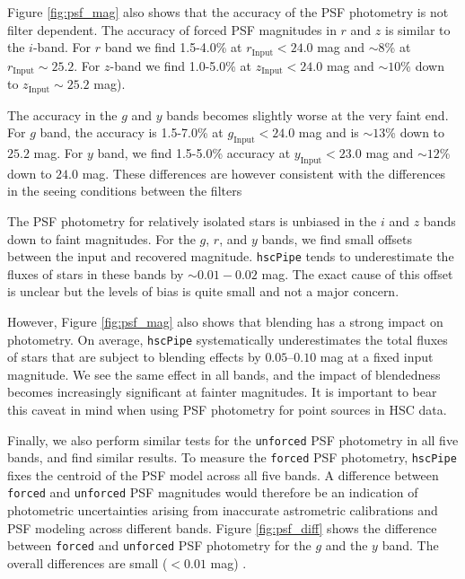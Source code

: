 \documentclass[useamsfonts]{pasj01}
\def\hscpipe{\texttt{hscPipe}}
\def\forced{\texttt{forced}}
\def\unforced{\texttt{unforced}}
\begin{document}
    Figure \ref{fig:psf_mag} also shows that the accuracy of the PSF photometry is 
    not filter dependent. 
    The accuracy of forced PSF magnitudes in $r$ and $z$ is similar to the $i$-band. 
    For $r$ band we find 1.5-4.0\% at $r_{\mathrm{Input}} < 24.0$ mag and ${\sim}8$\% 
    at $r_{\mathrm{Input}}{\sim}25.2$. 
    For $z$-band we find 1.0-5.0\% at $z_{\mathrm{Input}} < 24.0$ mag and ${\sim}10$\% 
    down to $z_{\mathrm{Input}}{\sim}25.2$ mag).
    
    The accuracy in the $g$ and $y$ bands becomes slightly worse at the very faint end. 
    For $g$ band, the accuracy is 1.5-7.0\% at $g_{\mathrm{Input}} < 24.0$ mag and is
    ${\sim}13$\% down to $25.2$ mag.
    For $y$ band, we find 1.5-5.0\% accuracy at $y_{\mathrm{Input}} < 23.0$ mag and
    ${\sim}12$\% down to $24.0$ mag. 
    These differences are however consistent with the differences in the seeing 
    conditions between the filters 

    The PSF photometry for relatively isolated stars is unbiased in the $i$ and $z$ 
    bands down to faint magnitudes. 
    For the $g$, $r$, and $y$ bands, we find small offsets between the input and 
    recovered magnitude. 
    \hscpipe{} tends to underestimate the fluxes of stars in these bands by 
    ${\sim}0.01-0.02$ mag. 
    The exact cause of this offset is unclear but the levels of bias is quite small 
    and not a major concern.  

	However, Figure \ref{fig:psf_mag} also shows that blending has a strong impact on 
	photometry.  
	On average, \hscpipe{} systematically underestimates the total fluxes of stars 
	that are subject to blending effects by $0.05$--$0.10$ mag at a fixed input magnitude.
    We see the same effect in all bands, and the impact of blendedness becomes
    increasingly significant at fainter magnitudes.
    It is important to bear this caveat in mind when using PSF photometry for point
    sources in HSC data.

	Finally, we also perform similar tests for the \unforced{} PSF photometry in all 
	five bands, and find similar results. 
	To measure the \forced{} PSF photometry, \hscpipe{} fixes the centroid of the PSF 
	model across all five bands. 
	A difference between \forced{} and \unforced{} PSF magnitudes would therefore be 
	an indication of photometric uncertainties arising from  inaccurate astrometric 
	calibrations and PSF modeling across different bands. 
	Figure \ref{fig:psf_diff} shows the difference between \forced{} and \unforced{} 
	PSF photometry for the $g$ and the $y$ band. 
	The overall differences are small ($<0.01$ mag) .
\end{document}
